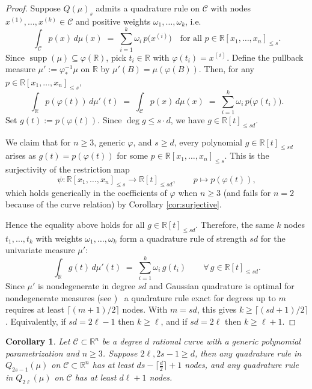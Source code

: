 \documentclass[11pt,a4paper]{amsart}
\numberwithin{equation}{section}
\newtheorem{cor}[thm]{Corollary}
\theoremstyle{definition}
\newcommand{\R}{\mathbb{R}}
\numberwithin{thm}{section}
\theoremstyle{break}
\numberwithin{subcase}{case}
\begin{document}
\begin{proof}
Suppose $Q(\mu)_s$ admits a quadrature rule on $\mathcal C$ with nodes $x^{(1)},\dots,x^{(k)}\in \mathcal C$ and
positive weights $\omega_1,\dots,\omega_k$, i.e.
\[
\int_{\mathcal C} p(x)\,d\mu(x)\;=\;\sum_{i=1}^k \omega_i\,p\bigl(x^{(i)}\bigr)
\quad\text{for all }p\in \R[x_1,\dots,x_n]_{\le s}.
\]
Since $\operatorname{supp}(\mu)\subseteq \varphi(\R)$, pick $t_i\in\R$ with $\varphi(t_i)=x^{(i)}$.
Define the pullback measure $\mu' := \varphi^{-1}_*\mu$ on $\R$ by $\mu'(B)=\mu(\varphi(B))$.
Then, for any $p\in \R[x_1,\dots,x_n]_{\le s}$,
\[
\int_{\R} p(\varphi(t))\, d\mu'(t)\;=\;\int_{\mathcal C} p(x)\,d\mu(x)
\;=\;\sum_{i=1}^k \omega_i\,p\bigl(\varphi(t_i)\bigr).
\]
Set $g(t):=p(\varphi(t))$. Since $\deg g \le s\cdot d$, we have $g\in \R[t]_{\le sd}$.

We claim that for $n\ge 3$, generic $\varphi$, and $s\ge d$, every polynomial
$g\in \R[t]_{\le sd}$ arises as $g(t)=p(\varphi(t))$ for some $p\in \R[x_1,\dots,x_n]_{\le s}$.
This is the surjectivity of the restriction map
\[
\psi:\R[x_1,\dots,x_n]_{\le s}\longrightarrow \R[t]_{\le sd},\qquad p\longmapsto p(\varphi(t)),
\]
which holds generically in the coefficients of $\varphi$ when $n\ge 3$ (and fails for $n=2$ because of
the curve relation) by Corollary \ref{cor:surjective}.

Hence the equality above holds for all $g\in \R[t]_{\le sd}$. Therefore, the same $k$ nodes $t_1,\dots,t_k$
with weights $\omega_1,\dots,\omega_k$ form a quadrature rule of strength $sd$ for the univariate measure $\mu'$:
\[
\int_{\R} g(t)\, d\mu'(t)\;=\;\sum_{i=1}^k \omega_i\, g(t_i)\qquad\forall\, g\in \R[t]_{\le sd}.
\]
Since $\mu'$ is nondegenerate in degree $sd$ and Gaussian quadrature is optimal for nondegenerate measures (see \cite[Thm 9.2]{RS}) \, a quadrature rule exact for degrees up to $m$ requires
at least $\lceil (m+1)/2\rceil$ nodes. With $m=sd$, this gives $k\ge \lceil (sd+1)/2\rceil$.
Equivalently, if $sd=2\ell-1$ then $k\ge \ell$, and if $sd=2\ell$ then $k\ge \ell+1$.
\end{proof}

\begin{cor}\label{cor:minimalnumberof nodes}
Let $\mathcal C\subset \R^n$ be a degree $d$ rational curve with a generic polynomial parametrization and $n\geq3$. Suppose $2\ell, 2s-1\geq d$, then
any quadrature rule in $Q_{2s-1}(\mu)$ on $\mathcal C\subset \R^n$ has at least $ds-\lceil\frac{d}{2} \rceil+1$ nodes, and
any quadrature rule in $Q_{2\ell}(\mu)$ on $\mathcal C$ has at least $d\ell+1$ nodes.
\end{cor}
\end{document}
